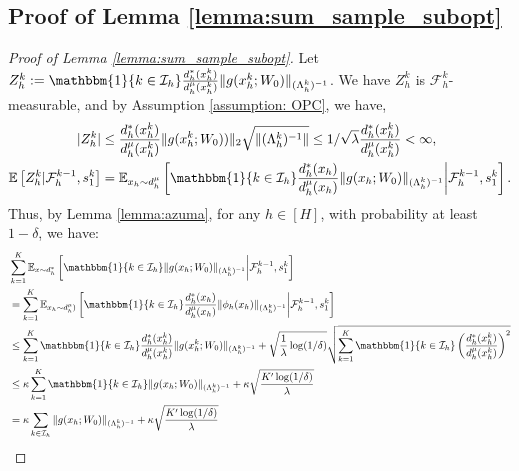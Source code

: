 \documentclass{article} \usepackage{iclr2023/iclr2023_conference,times}
\begin{document}
\subsection{Proof of Lemma \ref{lemma:sum_sample_subopt}}
\begin{proof}[Proof of Lemma \ref{lemma:sum_sample_subopt}]
Let $Z^k_h := \mathbbm{1}\{k \in \mathcal{I}_h\} \frac{d^*_h(x^k_h)}{d^{\mu}_h(x^k_h)} \| g(x^k_h; W_0)  \|_{(\Lambda^k_h)^{-1}}$. We have $Z^k_h$ is $\mathcal{F}_h^k$-measurable, and by Assumption \ref{assumption: OPC}, we have, 
\begin{align*}
    |Z^k_h| &\leq \frac{d^*_h(x^k_h)}{d^{\mu}_h(x^k_h)} \| g(x^k_h; W_0))  \|_2 \sqrt{\| (\Lambda^k_h)^{-1} \|} \leq 1/\sqrt{\lambda} \frac{d^*_h(x^k_h)}{d^{\mu}_h(x^k_h)} < \infty, \\ 
\mathbb{E} \left[ Z^k_h | \mathcal{F}_h^{k-1}, s^k_1 \right] &= \mathbb{E}_{x_h \sim d^{\mu}_h} \left[ \mathbbm{1}\{k \in \mathcal{I}_h\} \frac{d^*_h(x_h)}{d^{\mu}_h(x_h)} \| g(x_h; W_0) \|_{(\Lambda_h^k)^{-1}} \bigg| \mathcal{F}_h^{k-1}, s_1^k  \right].
\end{align*}
Thus, by Lemma \ref{lemma:azuma}, for any $h \in [H]$, with probability at least $1 - \delta$, we have: 
\begin{align*}
    &\sum_{k=1}^K \mathbb{E}_{x \sim d^*_h} \left[ \mathbbm{1}\{k \in \mathcal{I}_h\} \| g(x_h; W_0) \|_{(\Lambda_h^k)^{-1}} \bigg| \mathcal{F}_h^{k-1}, s_1^k  \right] \nonumber\\
    &=\sum_{k=1}^K \mathbb{E}_{x_h \sim d^{\mu}_h)} \left[ \mathbbm{1}\{k \in \mathcal{I}_h\} \frac{d^*_h(x_h)}{d^{\mu}_h(x_h)} \| \phi_h(x_h) \|_{(\Lambda_h^k)^{-1}} \bigg| \mathcal{F}_h^{k-1}, s_1^k  \right] \nonumber \\
    &\leq \sum_{k=1}^K \mathbbm{1}\{k \in \mathcal{I}_h\} \frac{d^*_h(x^k_h)}{d^{\mu}_h(x^k_h)} \| g(x^k_h; W_0)  \|_{(\Lambda^k_h)^{-1}} +  \sqrt{\frac{1}{\lambda} \log(1/\delta)} \sqrt{\sum_{k=1}^K \mathbbm{1}\{k \in \mathcal{I}_h\} \left(\frac{d^*_h(x^k_h)}{d^{\mu}_h(x^k_h)} \right)^2 } \\
    &\leq \kappa \sum_{k=1}^K  \mathbbm{1}\{k \in \mathcal{I}_h\} \| g(x_h; W_0)  \|_{(\Lambda^k_h)^{-1}} + 
    \kappa \sqrt{\frac{K' \log(1/\delta)}{\lambda}} \\
    &= \kappa \sum_{k \in \mathcal{I}_h}  \| g(x_h; W_0)  \|_{(\Lambda^k_h)^{-1}} + 
    \kappa \sqrt{\frac{K' \log(1/\delta)}{\lambda}}
\end{align*}
\end{proof}
\end{document}
